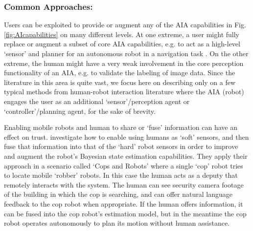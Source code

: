 \subsubsection{Common Approaches:} 
Users can be exploited to provide or augment any of the AIA capabilities in Fig. \ref{fig:AIcapabilities} on many different levels. 
At one extreme, a user might fully replace or augment a subset of core AIA capabilities, e.g. to act as a high-level `sensor' and planner for an autonomous robot in a navigation task \cite{Kaupp2008-yr}.  
On the other extreme, the human might have a very weak involvement in the core perception functionality of an AIA, e.g. to validate the labeling of image data. %
%
Since the literature in this area is quite vast, we focus here on describing only on a few typical methods from human-robot interaction literature where the AIA (robot) engages the user as an additional `sensor'/perception agent or `controller'/planning agent, for the sake of brevity. 

Enabling mobile robots and human to share or `fuse' information can have an effect on trust. \citet{Sweet2016-dw} investigate how to enable using humans as `soft' sensors, and then fuse that information into that of the `hard' robot sensors in order to improve and augment the robot's Bayesian state estimation capabilities. They apply their approach in a scenario called `Cops and Robots' where a single `cop' robot tries to locate mobile `robber' robots. In this case the human acts as a deputy that remotely interacts with the system. The human can see security camera footage of the building in which the cop is searching, and can offer natural language feedback to the cop robot when appropriate. If the human offers information, it can be fused into the cop robot's estimation model, but in the meantime the cop robot operates autonomously to plan its motion without human assistance. 

